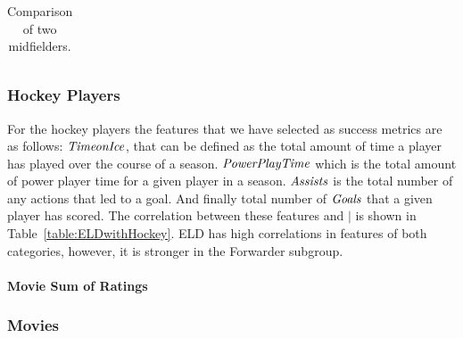 {\begin{table}[htbp]
{\begin{tabular}{|l|l|c|c|c|c|c|c|c|}
				\end{tabular}}
				\caption{Comparison of two midfielders.\label{table:MidfielderComparison}}
			\end{table}

	
	
						
						\begin{table}
						
						
							\centering
									\caption{Correlation between $\mid$ metric and success metrics of NHL Players.	\label{table:ELDwithHockey}}
							\end{table}
	\subsubsection{Hockey Players}
	For the hockey players the features that we have selected as success metrics are as follows: $\it{Time on Ice}$, that can be defined as the total amount of time a player has played over the course of a season. $\it{Power Play Time}$ which is the total amount of power player time for a given player in a season. $\it{Assists}$ is the total number of any actions that led to a goal. And finally total number of $\it{Goals}$ that a given player has scored.
The correlation between these features and $\mid$ is shown in Table~\ref{table:ELDwithHockey}. ELD has high correlations in features of both categories, however, it is stronger in the Forwarder subgroup.
		\paragraph{Movie Sum of Ratings}
	\subsubsection{Movies} 
	
}
